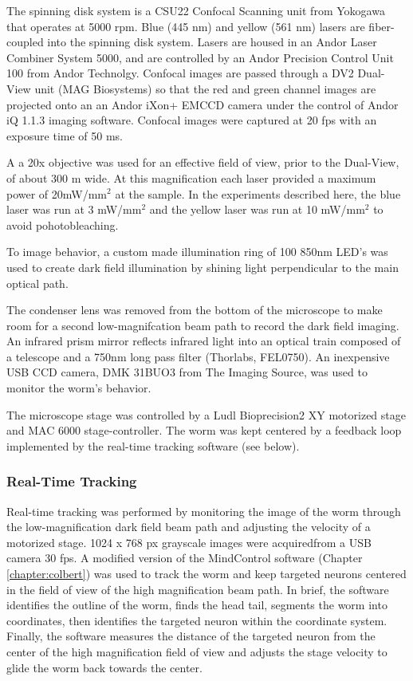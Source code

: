 The spinning disk system is a CSU22 Confocal Scanning unit from Yokogawa that operates at 5000 rpm. Blue (445 nm) and yellow (561 nm) lasers are fiber-coupled into the spinning disk system. Lasers are housed in an  Andor Laser Combiner System 5000, and are controlled by an Andor Precision Control Unit 100 from Andor Technolgy. Confocal images are passed through a DV2 Dual-View  unit (MAG Biosystems) so that the red and green channel images are projected onto an an Andor iXon+ EMCCD camera under the control of Andor iQ 1.1.3 imaging software. Confocal images were captured at 20 fps with an exposure time of 50 ms. 

 A a 20x objective was used for an effective field of view, prior to the Dual-View, of about 300 \textmu m wide. At this magnification each laser  provided a maximum power of 20mW/mm$^2$ at the sample. In the experiments described here, the blue laser was run at 3 mW/mm$^2$ and the yellow laser was run at 10 mW/mm$^2$ to avoid pohotobleaching.

To image behavior, a custom made illumination ring of 100 850nm LED's was used to create dark field illumination by shining light  perpendicular to the main optical path. 

The condenser lens was removed from the bottom of the microscope to make room for a second low-magnifcation beam path to record the dark field imaging. An infrared prism mirror reflects infrared light into an optical train composed of a telescope and a 750nm long pass filter (Thorlabs, FEL0750).  An inexpensive USB CCD camera, DMK 31BUO3 from The Imaging Source,  was used to monitor the worm's behavior.  

The microscope stage was controlled by a Ludl Bioprecision2 XY motorized stage and MAC 6000 stage-controller. The worm was kept centered by a  feedback loop implemented by the real-time tracking software (see below).

\subsubsection{Real-Time Tracking} \label{sec:omegaSoftware}
Real-time tracking was performed by monitoring the image of the worm through the low-magnification dark field beam path and adjusting the velocity of a motorized stage. 1024 x 768 px grayscale images were acquiredfrom a USB camera 30 fps. A modified version of the MindControl software (Chapter \ref{chapter:colbert}) was used to track the worm and keep targeted neurons centered in the field of view of the high magnification beam path. In brief, the software identifies the outline of the worm, finds the head tail, segments the worm into coordinates, then identifies the targeted neuron within the coordinate system. Finally, the software measures the distance of the targeted neuron from the center of the high magnification field of view and adjusts the stage velocity to glide the worm back towards the center.

